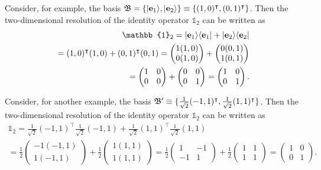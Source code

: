 {\color{blue}
\bexample
Consider, for example, the basis
${\frak B}=\{ \vert {\bf e}_1 \rangle , \vert {\bf e}_2 \rangle \} \equiv \{(1,0)^\intercal ,(0,1)^\intercal \}$.
Then the two-dimensional resolution of the identity operator $\mathbb{1}_2$
can be written as
\begin{equation}
\begin{split}
\mathbb{1}_2 =   \vert {\bf e}_1 \rangle \langle  {\bf e}_1 \vert   +     \vert {\bf e}_2 \rangle  \langle  {\bf e}_2 \vert \\
=   (1,0)^\intercal  (1,0) +   (0,1)^\intercal  (0,1)
=
\begin{pmatrix}
1 (1,0) \\  0 (1,0)
\end{pmatrix}
 +
\begin{pmatrix}
0 (0,1)\\
1 (0,1)
\end{pmatrix} \\
 =
\begin{pmatrix}
1 & 0 \\
0 & 0
\end{pmatrix}
+
\begin{pmatrix}
0 & 0 \\
0 & 1
\end{pmatrix}
=
\begin{pmatrix}
1 & 0 \\
0 & 1
\end{pmatrix}
.
\end{split}
\end{equation}

Consider, for another example, the basis
${\frak B}' \equiv \{\frac{1}{\sqrt{2}}(-1,1)^\intercal ,\frac{1}{\sqrt{2}}(1,1)^\intercal \}$.
Then the two-dimensional resolution of the identity operator $\mathbb{1}_2$
can be written as
\begin{equation}
\begin{split}
\mathbb{1}_2 =  \frac{1}{\sqrt{2}}   (-1,1)^\intercal   \frac{1}{\sqrt{2}}(-1,1) +   \frac{1}{\sqrt{2}}(1,1)^\intercal  \frac{1}{\sqrt{2}}(1,1)
\\
=
\frac{1}{{2}}
\begin{pmatrix}
-1 (-1,1) \\  1 (-1,1)
\end{pmatrix}
 +
\frac{1}{{2}}
\begin{pmatrix}
1 (1,1)\\
1 (1,1)
\end{pmatrix}
 =
\frac{1}{{2}}
\begin{pmatrix}
1 & -1 \\
-1 & 1
\end{pmatrix}
+
\frac{1}{{2}}
\begin{pmatrix}
1 & 1 \\
1 & 1
\end{pmatrix}
=
\begin{pmatrix}
1 & 0 \\
0 & 1
\end{pmatrix}
.
\end{split}
\end{equation}


\eexample
}


